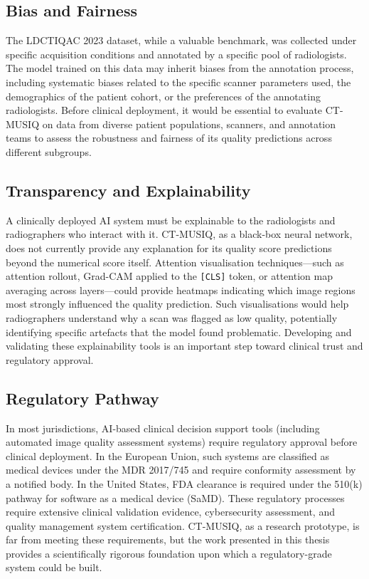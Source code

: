 \subsection{Bias and Fairness}

The LDCTIQAC 2023 dataset, while a valuable benchmark, was collected under specific
acquisition conditions and annotated by a specific pool of radiologists. The model
trained on this data may inherit biases from the annotation process, including
systematic biases related to the specific scanner parameters used, the demographics
of the patient cohort, or the preferences of the annotating radiologists. Before
clinical deployment, it would be essential to evaluate CT-MUSIQ on data from diverse
patient populations, scanners, and annotation teams to assess the robustness and fairness
of its quality predictions across different subgroups.

\subsection{Transparency and Explainability}

A clinically deployed AI system must be explainable to the radiologists and
radiographers who interact with it. CT-MUSIQ, as a black-box neural network, does not
currently provide any explanation for its quality score predictions beyond the numerical
score itself. Attention visualisation techniques---such as attention rollout, Grad-CAM
applied to the \texttt{[CLS]} token, or attention map averaging across layers---could
provide heatmaps indicating which image regions most strongly influenced the quality
prediction. Such visualisations would help radiographers understand why a scan was
flagged as low quality, potentially identifying specific artefacts that the model found
problematic. Developing and validating these explainability tools is an important step
toward clinical trust and regulatory approval.

\subsection{Regulatory Pathway}

In most jurisdictions, AI-based clinical decision support tools (including automated
image quality assessment systems) require regulatory approval before clinical deployment.
In the European Union, such systems are classified as medical devices under the MDR
2017/745 and require conformity assessment by a notified body. In the United States,
FDA clearance is required under the 510(k) pathway for software as a medical device
(SaMD). These regulatory processes require extensive clinical validation evidence,
cybersecurity assessment, and quality management system certification. CT-MUSIQ, as a
research prototype, is far from meeting these requirements, but the work presented in
this thesis provides a scientifically rigorous foundation upon which a regulatory-grade
system could be built.

